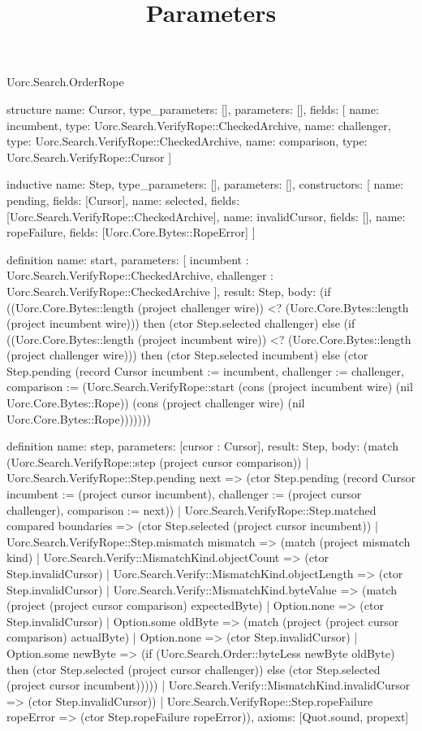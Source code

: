 \begin{lexlean}{Uorc.Search.OrderRope}
\title{Parameters}
\begin{semanticmodule}
structure{
  name: Cursor,
  type_parameters: [],
  parameters: [],
  fields: [
    {name: incumbent, type: Uorc.Search.VerifyRope::CheckedArchive},
    {name: challenger, type: Uorc.Search.VerifyRope::CheckedArchive},
    {name: comparison, type: Uorc.Search.VerifyRope::Cursor}
  ]
}

inductive{
  name: Step,
  type_parameters: [],
  parameters: [],
  constructors: [
    {name: pending, fields: [Cursor]},
    {name: selected, fields: [Uorc.Search.VerifyRope::CheckedArchive]},
    {name: invalidCursor, fields: []},
    {name: ropeFailure, fields: [Uorc.Core.Bytes::RopeError]}
  ]
}

definition{
  name: start,
  parameters: [
    incumbent : Uorc.Search.VerifyRope::CheckedArchive,
    challenger : Uorc.Search.VerifyRope::CheckedArchive
  ],
  result: Step,
  body: (if ((Uorc.Core.Bytes::length (project challenger wire)) <? (Uorc.Core.Bytes::length (project incumbent wire))) then (ctor Step.selected challenger) else (if ((Uorc.Core.Bytes::length (project incumbent wire)) <? (Uorc.Core.Bytes::length (project challenger wire))) then (ctor Step.selected incumbent) else (ctor Step.pending (record Cursor {incumbent := incumbent, challenger := challenger, comparison := (Uorc.Search.VerifyRope::start (cons (project incumbent wire) (nil Uorc.Core.Bytes::Rope)) (cons (project challenger wire) (nil Uorc.Core.Bytes::Rope)))}))))
}

definition{
  name: step,
  parameters: [cursor : Cursor],
  result: Step,
  body: (match (Uorc.Search.VerifyRope::step (project cursor comparison))
    | Uorc.Search.VerifyRope::Step.pending next => (ctor Step.pending (record Cursor {incumbent := (project cursor incumbent), challenger := (project cursor challenger), comparison := next}))
    | Uorc.Search.VerifyRope::Step.matched compared boundaries => (ctor Step.selected (project cursor incumbent))
    | Uorc.Search.VerifyRope::Step.mismatch mismatch => (match (project mismatch kind)
      | Uorc.Search.Verify::MismatchKind.objectCount => (ctor Step.invalidCursor)
      | Uorc.Search.Verify::MismatchKind.objectLength => (ctor Step.invalidCursor)
      | Uorc.Search.Verify::MismatchKind.byteValue => (match (project (project cursor comparison) expectedByte)
        | Option.none => (ctor Step.invalidCursor)
        | Option.some oldByte => (match (project (project cursor comparison) actualByte)
          | Option.none => (ctor Step.invalidCursor)
          | Option.some newByte => (if (Uorc.Search.Order::byteLess newByte oldByte) then (ctor Step.selected (project cursor challenger)) else (ctor Step.selected (project cursor incumbent)))))
      | Uorc.Search.Verify::MismatchKind.invalidCursor => (ctor Step.invalidCursor))
    | Uorc.Search.VerifyRope::Step.ropeFailure ropeError => (ctor Step.ropeFailure ropeError)),
  axioms: [Quot.sound, propext]
}


\end{semanticmodule}
\end{lexlean}
